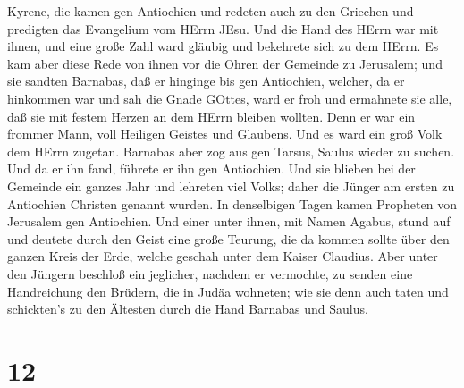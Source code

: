 Kyrene, die kamen gen Antiochien und redeten auch zu den Griechen und
predigten das Evangelium vom HErrn JEsu.  Und die Hand des
HErrn war mit ihnen, und eine große Zahl ward gläubig und bekehrete sich
zu dem HErrn.  Es kam aber diese Rede von ihnen vor die
Ohren der Gemeinde zu Jerusalem; und sie sandten Barnabas, daß er
hinginge bis gen Antiochien,  welcher, da er hinkommen war
und sah die Gnade GOttes, ward er froh und ermahnete sie alle, daß sie
mit festem Herzen an dem HErrn bleiben wollten.  Denn er
war ein frommer Mann, voll Heiligen Geistes und Glaubens. Und es ward
ein groß Volk dem HErrn zugetan.  Barnabas aber zog aus gen
Tarsus, Saulus wieder zu suchen.  Und da er ihn fand,
führete er ihn gen Antiochien. Und sie blieben bei der Gemeinde ein
ganzes Jahr und lehreten viel Volks; daher die Jünger am ersten zu
Antiochien Christen genannt wurden.  In denselbigen Tagen
kamen Propheten von Jerusalem gen Antiochien.  Und einer
unter ihnen, mit Namen Agabus, stund auf und deutete durch den Geist
eine große Teurung, die da kommen sollte über den ganzen Kreis der Erde,
welche geschah unter dem Kaiser Claudius.  Aber unter den
Jüngern beschloß ein jeglicher, nachdem er vermochte, zu senden eine
Handreichung den Brüdern, die in Judäa wohneten;  wie sie
denn auch taten und schickten's zu den Ältesten durch die Hand Barnabas
und Saulus.

\hypertarget{section-11}{%
\section{12}\label{section-11}}

